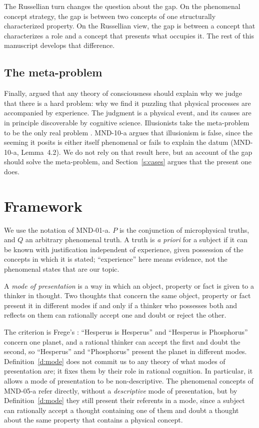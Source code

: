 \documentclass{situationist-preprint}
\begin{document}
The Russellian turn changes the question about the gap. On the phenomenal concept strategy, the gap is between two concepts of one structurally characterized property. On the Russellian view, the gap is between a concept that characterizes a role and a concept that presents what occupies it. The rest of this manuscript develops that difference.

\subsection{The meta-problem}

Finally, \citet{Chalmers2018} argued that any theory of consciousness should explain why we judge that there is a hard problem: why we find it puzzling that physical processes are accompanied by experience. The judgment is a physical event, and its causes are in principle discoverable by cognitive science. Illusionists take the meta-problem to be the only real problem \citep{Frankish2016}. MND-10-a argues that illusionism is false, since the seeming it posits is either itself phenomenal or fails to explain the datum (MND-10-a, Lemma~4.2). We do not rely on that result here, but an account of the gap should solve the meta-problem, and Section~\ref{s:cases} argues that the present one does.

\section{Framework}\label{s:frame}

We use the notation of MND-01-a. $P$ is the conjunction of microphysical truths, and $Q$ an arbitrary phenomenal truth. A truth is \emph{a priori} for a subject if it can be known with justification independent of experience, given possession of the concepts in which it is stated; \enquote{experience} here means evidence, not the phenomenal states that are our topic.

\begin{definition}\label{d:mode}
A \emph{mode of presentation} is a way in which an object, property or fact is given to a thinker in thought. Two thoughts that concern the same object, property or fact present it in different modes if and only if a thinker who possesses both and reflects on them can rationally accept one and doubt or reject the other.
\end{definition}

The criterion is Frege's \citep{Frege1892}: \enquote{Hesperus is Hesperus} and \enquote{Hesperus is Phosphorus} concern one planet, and a rational thinker can accept the first and doubt the second, so \enquote{Hesperus} and \enquote{Phosphorus} present the planet in different modes. Definition~\ref{d:mode} does not commit us to any theory of what modes of presentation are; it fixes them by their role in rational cognition. In particular, it allows a mode of presentation to be non-descriptive. The phenomenal concepts of MND-05-a refer directly, without a \emph{descriptive} mode of presentation, but by Definition~\ref{d:mode} they still present their referents in a mode, since a subject can rationally accept a thought containing one of them and doubt a thought about the same property that contains a physical concept.
\end{document}
